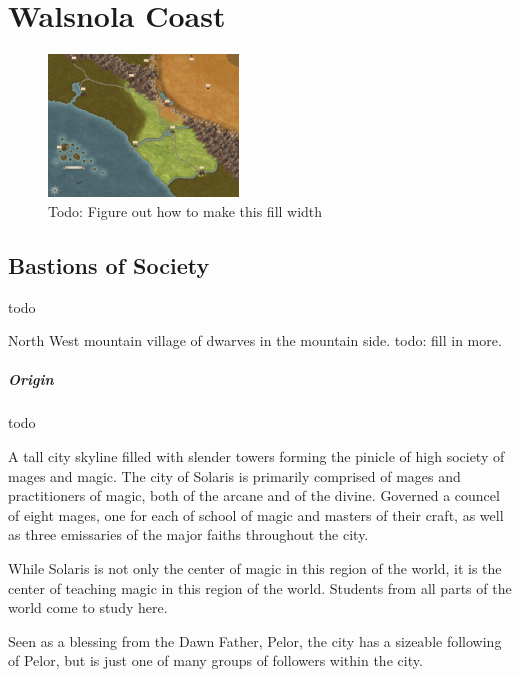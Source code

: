 \documentclass[letterpaper, twocolumn, openany, nodeprecatedcode, layout=true]{dndbook}
\begin{document}
\chapter{Walsnola Coast}

\begin{figure}[h!]
  \centering
  \includegraphics[width=0.45\textwidth]{maps/coastline.jpg}
  \caption{Todo: Figure out how to make this fill width}
\end{figure}

\section{Bastions of Society}

todo


North West mountain village of dwarves in the mountain side. todo: fill in more.

\paragraph{Origin}

todo


A tall city skyline filled with slender towers forming the pinicle of high society of
mages and magic. The city of Solaris is primarily comprised of mages and practitioners
of magic, both of the arcane and of the divine. Governed a councel of eight mages, one
for each of school of magic and masters of their craft, as well as three emissaries of
the major faiths throughout the city.

While Solaris is not only the center of magic in this region of the world, it is the
center of teaching magic in this region of the world. Students from all parts of the
world come to study here.

Seen as a blessing from the Dawn Father, Pelor, the city has a sizeable following of
Pelor, but is just one of many groups of followers within the city.
\end{document}
